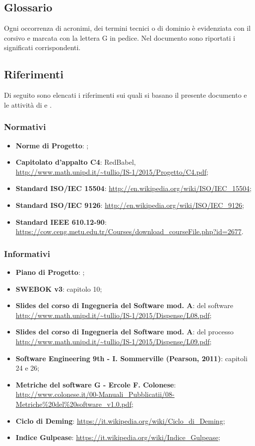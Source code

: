 \subsection{Glossario}
Ogni occorrenza di acronimi, dei termini tecnici o di dominio è evidenziata con il corsivo e marcata con la lettera G in pedice. Nel documento \Glossario sono riportati i significati corrispondenti.

\subsection{Riferimenti}
Di seguito  sono elencati i riferimenti sui quali si basano il presente documento e le attività di  e .

\subsubsection{Normativi}
\begin{itemize}
\item \textbf{Norme di Progetto}: \NormeDiProgetto;
\item \textbf{Capitolato d'appalto C4}: RedBabel,  \url{http://www.math.unipd.it/~tullio/IS-1/2015/Progetto/C4.pdf};
\item \textbf{Standard ISO/IEC 15504}: \url{http://en.wikipedia.org/wiki/ISO/IEC_15504};
\item \textbf{Standard ISO/IEC 9126}: \url{http://en.wikipedia.org/wiki/ISO/IEC_9126};
\item \textbf{Standard IEEE 610.12-90}: \url{https://cow.ceng.metu.edu.tr/Courses/download_courseFile.php?id=2677}.
\end{itemize}
	
\subsubsection{Informativi}
\begin{itemize}
\item \textbf{Piano di Progetto}: \PianoDiProgetto;
\item \textbf{SWEBOK v3}: capitolo 10;
\item \textbf{Slides del corso di Ingegneria del Software mod. A}:  del software \url{http://www.math.unipd.it/~tullio/IS-1/2015/Dispense/L08.pdf};
\item \textbf{Slides del corso di Ingegneria del Software mod. A}:  del processo \url{http://www.math.unipd.it/~tullio/IS-1/2015/Dispense/L09.pdf};
\item \textbf{Software Engineering 9th - I. Sommerville (Pearson, 2011)}: capitoli 24 e 26;
\item \textbf{Metriche del software G - Ercole F. Colonese}: \url{http://www.colonese.it/00-Manuali_Pubblicatii/08-Metriche%20del%20software_v1.0.pdf};
\item \textbf{Ciclo di Deming}: \url{https://it.wikipedia.org/wiki/Ciclo_di_Deming};
\item \textbf{Indice Gulpease}: \url{https://it.wikipedia.org/wiki/Indice_Gulpease};
\end{itemize}
